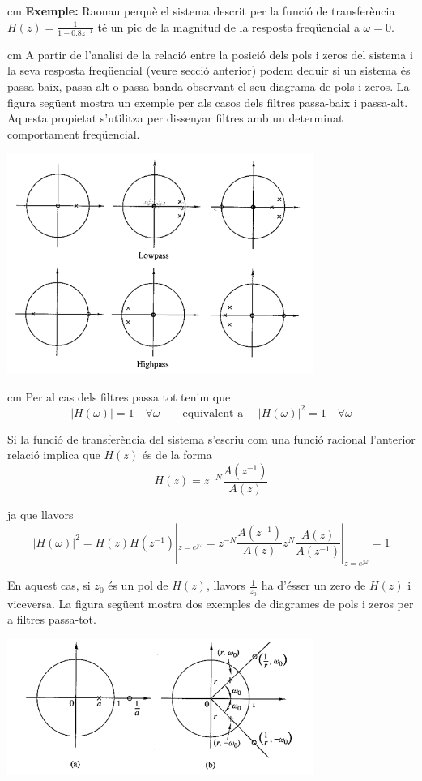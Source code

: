 \documentclass{article}
\begin{document}
 cm
\textbf{Exemple:} Raonau perquè el sistema descrit per la funció de transferència $H(z)=\frac{1}{1-0.8z^{-1}}$
té un pic de la magnitud de la resposta freqüencial a $\omega=0$.
 

 cm
A partir de l'analisi de la relació entre la posició dels pols i zeros del sistema i la seva
resposta freqüencial (veure secció anterior) podem deduir si un sistema és passa-baix, passa-alt
o passa-banda observant el seu diagrama de pols i zeros. La figura següent
mostra un exemple per als casos dels filtres passa-baix i passa-alt. 
Aquesta propietat s'utilitza per dissenyar filtres
amb un determinat comportament freqüencial. 

\begin{center}
\includegraphics[width=10cm]{polszerosfiltres.png}
\end{center}


 cm
Per al cas dels filtres passa tot tenim que 
\[
|H(\omega)|=1 \quad \forall \omega \qquad \text{equivalent a } \quad |H(\omega)|^2=1 \quad \forall \omega
\]

Si la funció de transferència del sistema s'escriu com una funció racional l'anterior relació
implica que $H(z)$ és de la forma 
\[
H(z)=z^{-N} \frac{A(z^{-1})}{A(z)}
\]

\noindent
ja que llavors
\[
|H(\omega)|^2=H(z) H(z^{-1})|_{z=e^{j\omega}}= z^{-N} \frac{A(z^{-1})}{A(z)} z^{N} \frac{A(z)}{A(z^{-1})}|_{z=e^{j\omega}}= 1
\]

En aquest cas, si $z_0$ \'es un pol de $H(z)$, llavors $\frac{1}{z_0}$ ha d'ésser un zero de $H(z)$ i viceversa.
La figura següent mostra dos exemples de diagrames de pols i zeros per a filtres passa-tot.

\begin{center}
\includegraphics[width=10cm]{polszerospassatot.png}
\end{center}
\end{document}
